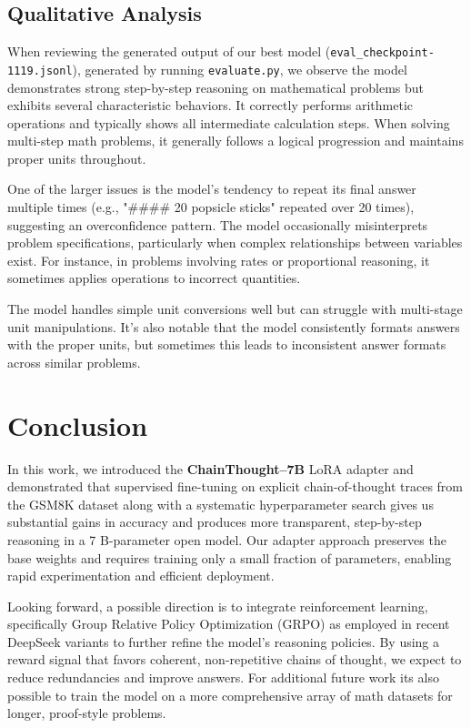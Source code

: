 \documentclass[11pt]{article}
\begin{document}
\subsection{Qualitative Analysis}
When reviewing the generated output of our best model (\verb|eval_checkpoint-1119.jsonl|), generated by running \verb|evaluate.py|, we observe the model demonstrates strong step-by-step reasoning on mathematical problems but exhibits several characteristic behaviors. It correctly performs arithmetic operations and typically shows all intermediate calculation steps. When solving multi-step math problems, it generally follows a logical progression and maintains proper units throughout.

One of the larger issues is the model's tendency to repeat its final answer multiple times (e.g., "\#\#\#\# 20 popsicle sticks" repeated over 20 times), suggesting an overconfidence pattern. The model occasionally misinterprets problem specifications, particularly when complex relationships between variables exist. For instance, in problems involving rates or proportional reasoning, it sometimes applies operations to incorrect quantities.

The model handles simple unit conversions well but can struggle with multi-stage unit manipulations. It's also notable that the model consistently formats answers with the proper units, but sometimes this leads to inconsistent answer formats across similar problems.

\section{Conclusion}

In this work, we introduced the \textbf{ChainThought–7B} LoRA adapter and demonstrated that supervised fine-tuning on explicit chain-of-thought traces from the GSM8K dataset along with a systematic hyperparameter search gives us substantial gains in accuracy and produces more transparent, step-by-step reasoning in a 7 B-parameter open model. Our adapter approach preserves the base weights and requires training only a small fraction of parameters, enabling rapid experimentation and efficient deployment.

Looking forward, a possible direction is to integrate reinforcement learning, specifically Group Relative Policy Optimization (GRPO) as employed in recent DeepSeek variants to further refine the model's reasoning policies. By using a reward signal that favors coherent, non-repetitive chains of thought, we expect to reduce redundancies and improve answers. For additional future work its also possible to train the model on a more comprehensive array of math datasets for longer, proof-style problems.
\end{document}
